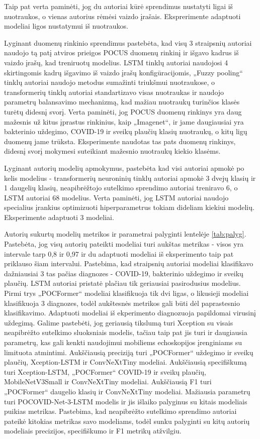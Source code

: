 \documentclass[fleqn]{VUMIFKompMagistrinis}
\begin{document}
\par
Taip pat verta paminėti, jog du autoriai kūrė sprendimus nustatyti ligai iš nuotraukos, o vienas autorius rėmėsi vaizdo įrašais. Eksprerimente adaptuoti modeliai ligos nustatymui iš nuotraukos.
\par
Lyginant duomenų rinkinio sprendimus pastebėta, kad visų 3 straipsnių autoriai naudojo tą patį atviros prieigos POCUS duomenų rinkinį \cite{born2021accelerating} ir išgavo kadrus iš vaizdo įrašų, kad treniruotų modelius. LSTM tinklų autoriai naudojosi 4 skirtingomis kadrų išgavimo iš vaizdo įrašų konfigūracijomis, „Fuzzy pooling“ tinklų autoriai naudojo metodus sumažinti triukšmui nuotraukose, o transformerių tinklų autoriai standartizavo visas nuotraukas ir naudojo parametrų balansavimo mechanizmą, kad mažiau nuotraukų turinčios klasės turėtų didesnį svorį. Verta paminėti, jog POCUS duomenų rinkinys yra daug mažesnis už kitus įprastus rinkinius, kaip „Imagenet“, ir jame daugiausiai yra bakterinio uždegimo, COVID-19 ir sveikų plaučių klasių nuotraukų, o kitų ligų duomenų jame trūksta. Eksperimente naudotas tas pats duomenų rinkinys, didesnį svorį mokymesi suteikiant mažesnio nuotraukų kiekio klasėms.
\par
Lyginant autorių modelių apmokymus, pastebėta kad visi autoriai apmokė po kelis modelius - transformerių neuroninių tinklų autoriai apmokė 3 dvejų klasių ir 1 daugelių klasių, neapibrėžtojo sutelkimo sprendimo autoriai treniravo 6, o LSTM autoriai 68 modelius. Verta paminėti, jog LSTM autoriai naudojo specialius įrankius optimizuoti hiperparametrus tokiam dideliam kiekiui modelių. Eksperimente adaptuoti 3 modeliai.
\par
Autorių sukurtų modelių metrikos ir parametrai palyginti lentelėje \ref{tab:palyg}. Pastebėta, jog visų autorių pateikti modeliai turi aukštas metrikas - visos yra intervale tarp 0,8 ir 0,97 ir du adaptuoti modeliai iš eksperimento taip pat priklauso šiam intervalui. Pastebima, kad straipsnių autoriai modeliai klasifikavo dažniausiai 3 tas pačias diagnozes - COVID-19, bakterinio uždegimo ir sveikų plaučių. LSTM autoriai pristatė plačiau tik geriausiai pasirodusius modelius. Pirmi trys „POCFormer“ modeliai klasifikuoja tik dvi ligas, o likusieji modeliai klasifikuoja 3 diagnozes, todėl aukštesnės metrikos gali būti dėl paprastesnio klasifikavimo. Adaptuoti modeliai iš ekperimento diagnozuoja papildomai virusinį uždegimą. Galime pastebėti, jog geriausią tikslumą turi Xception su visais neapibrėžto sutelkimo sluoksniais modelis, tačiau taip pat jis turi ir daugiausia parametrų, kas gali kenkti naudojimui mobiliems echoskopijos įrenginiams su limituota atmintimi. Aukščiausią preciziją turi „POCFormer“ uždegimo ir sveikų plaučių, Xception-LSTM ir ConvNeXtTiny modeliai. Aukščiausią specifiškumą turi Xception-LSTM, „POCFormer“ COVID-19 ir sveikų plaučių, MobileNetV3Small ir ConvNeXtTiny modeliai. Aukščiausią F1 turi „POCFormer“ daugelio klasių ir ConvNeXtTiny modeliai. Mažiausia parametrų turi POCOVID-Net-3-LSTM modelis ir jis išlaiko palyginus su kitais modeliais puikias metrikas. Pastebima, kad neapibrėžto sutelkimo sprendimo autoriai pateikė kitokias metrikas savo modeliams, todėl sunku palyginti su kitų autorių modeliais precizijos, specifiškumo ir F1 metrikų atžvilgiu. 
\end{document}

